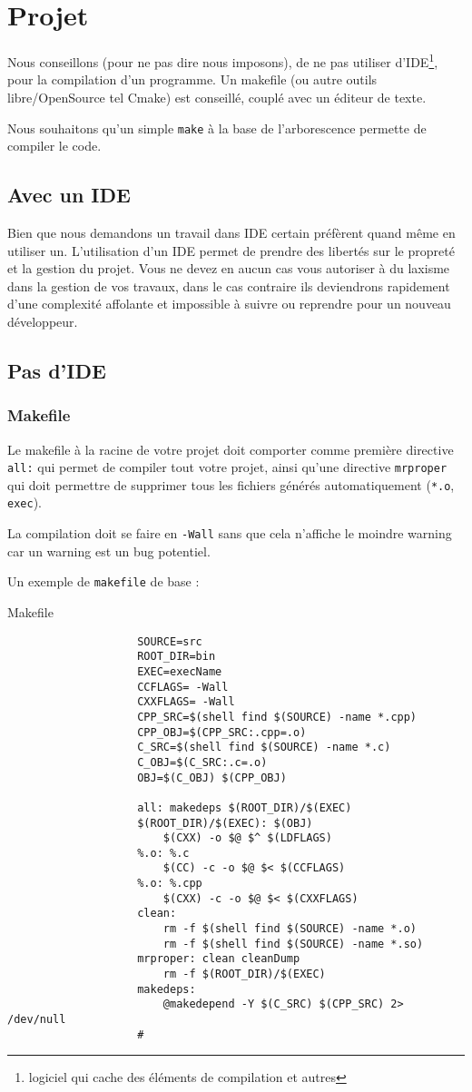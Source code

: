 \section{Projet}
	Nous conseillons (pour ne pas dire nous imposons), de ne pas utiliser d'IDE\footnote{logiciel qui cache des éléments de compilation et autres}, pour la compilation d'un programme. Un makefile (ou autre outils libre/OpenSource tel Cmake) est conseillé, couplé avec un éditeur de texte.

	Nous souhaitons qu'un simple \verb+make+ à la base de l'arborescence permette de compiler le code.

	\subsection{Avec un IDE}
		Bien que nous demandons un travail dans IDE certain préfèrent quand même en utiliser un. L'utilisation d'un IDE permet de prendre des libertés sur le propreté et la gestion du projet. Vous ne devez en aucun cas vous autoriser à du laxisme dans la gestion de vos travaux, dans le cas contraire ils deviendrons rapidement d'une complexité affolante et impossible à suivre ou reprendre pour un nouveau développeur.

	\subsection{Pas d'IDE}
		\subsubsection{Makefile}
			Le makefile à la racine de votre projet doit comporter comme première directive \verb+all:+ qui permet de compiler tout votre projet, ainsi qu'une directive \verb+mrproper+ qui doit permettre de supprimer tous les fichiers générés automatiquement (\verb+*.o+, \verb+exec+).

			La compilation doit se faire en \verb+-Wall+ sans que cela n’affiche le moindre warning car un warning est un bug potentiel.

			Un exemple de \verb+makefile+ de base :

			\begin{cbox}{Makefile}
				\begin{verbatim}
					SOURCE=src
					ROOT_DIR=bin
					EXEC=execName
					CCFLAGS= -Wall
					CXXFLAGS= -Wall
					CPP_SRC=$(shell find $(SOURCE) -name *.cpp)
					CPP_OBJ=$(CPP_SRC:.cpp=.o)
					C_SRC=$(shell find $(SOURCE) -name *.c)
					C_OBJ=$(C_SRC:.c=.o)
					OBJ=$(C_OBJ) $(CPP_OBJ)

					all: makedeps $(ROOT_DIR)/$(EXEC)
					$(ROOT_DIR)/$(EXEC): $(OBJ)
					    $(CXX) -o $@ $^ $(LDFLAGS)
					%.o: %.c
					    $(CC) -c -o $@ $< $(CCFLAGS)
					%.o: %.cpp
					    $(CXX) -c -o $@ $< $(CXXFLAGS)
					clean:
					    rm -f $(shell find $(SOURCE) -name *.o)
					    rm -f $(shell find $(SOURCE) -name *.so)
					mrproper: clean cleanDump
					    rm -f $(ROOT_DIR)/$(EXEC)
					makedeps:
					    @makedepend -Y $(C_SRC) $(CPP_SRC) 2> /dev/null
				    #
				\end{verbatim}
			\end{cbox}

